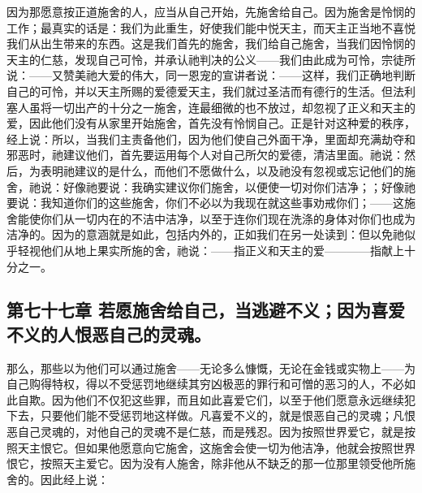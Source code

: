 因为那愿意按正道施舍的人，应当从自己开始，先施舍给自己。因为施舍是怜悯的工作；最真实的话是：我们为此重生，好使我们能中悦天主，而天主正当地不喜悦我们从出生带来的东西。这是我们首先的施舍，我们给自己施舍，当我们因怜悯的天主的仁慈，发现自己可怜，并承认祂判决的公义——我们由此成为可怜，宗徒所说：——又赞美祂大爱的伟大，同一恩宠的宣讲者说：——这样，我们正确地判断自己的可怜，并以天主所赐的爱德爱天主，我们就过圣洁而有德行的生活。但法利塞人虽将一切出产的十分之一施舍，连最细微的也不放过，却忽视了正义和天主的爱，因此他们没有从家里开始施舍，首先没有怜悯自己。正是针对这种爱的秩序，经上说：所以，当我们主责备他们，因为他们使自己外面干净，里面却充满劫夺和邪恶时，祂建议他们，首先要运用每个人对自己所欠的爱德，清洁里面。祂说：然后，为表明祂建议的是什么，而他们不愿做什么，以及祂没有忽视或忘记他们的施舍，祂说：好像祂要说：我确实建议你们施舍，以便使一切对你们洁净；；好像祂要说：我知道你们的这些施舍，你们不必以为我现在就这些事劝戒你们；——这施舍能使你们从一切内在的不洁中洁净，以至于连你们现在洗涤的身体对你们也成为洁净的。因为的意涵就是如此，包括内外的，正如我们在另一处读到：但以免祂似乎轻视他们从地上果实所施的舍，祂说：——指正义和天主的爱————指献上十分之一。\par


\subsection{第七十七章 若愿施舍给自己，当逃避不义；因为喜爱不义的人恨恶自己的灵魂。}

那么，那些以为他们可以通过施舍——无论多么慷慨，无论在金钱或实物上——为自己购得特权，得以不受惩罚地继续其穷凶极恶的罪行和可憎的恶习的人，不必如此自欺。因为他们不仅犯这些罪，而且如此喜爱它们，以至于他们愿意永远继续犯下去，只要他们能不受惩罚地这样做。凡喜爱不义的，就是恨恶自己的灵魂；凡恨恶自己灵魂的，对他自己的灵魂不是仁慈，而是残忍。因为按照世界爱它，就是按照天主恨它。但如果他愿意向它施舍，这施舍会使一切为他洁净，他就会按照世界恨它，按照天主爱它。因为没有人施舍，除非他从不缺乏的那一位那里领受他所施舍的。因此经上说：\par

